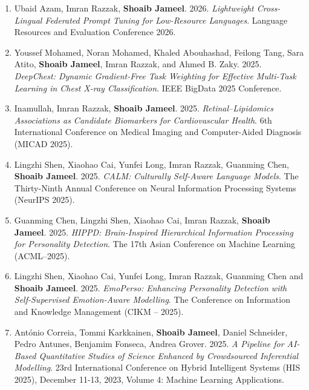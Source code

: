 \documentclass[margin]{res}
\begin{document}
\begin{resume}
\begin{enumerate}
\item Ubaid Azam, Imran Razzak, \textbf{Shoaib Jameel}. 2026. \textit{Lightweight Cross-Lingual Federated Prompt Tuning for Low-Resource Languages}. Language Resources and Evaluation Conference 2026. \\

\item Youssef Mohamed, Noran Mohamed, Khaled Abouhashad, Feilong Tang, Sara Atito, \textbf{Shoaib Jameel}, Imran Razzak, and Ahmed B. Zaky. 2025. \textit{DeepChest: Dynamic Gradient-Free Task Weighting for Effective Multi-Task Learning in Chest X-ray Classification}. IEEE BigData 2025 Conference. \\

\item Inamullah, Imran Razzak, \textbf{Shoaib Jameel}. 2025. \textit{Retinal–Lipidomics Associations as Candidate Biomarkers for Cardiovascular Health}. 6th International Conference on Medical Imaging and Computer-Aided Diagnosis (MICAD 2025). \\

\item Lingzhi Shen, Xiaohao Cai, Yunfei Long, Imran Razzak, Guanming Chen, \textbf{Shoaib Jameel}. 2025. \textit{CALM: Culturally Self-Aware Language Models}. The Thirty-Ninth Annual Conference on Neural Information Processing Systems (NeurIPS 2025). \\

\item Guanming Chen, Lingzhi Shen, Xiaohao Cai, Imran Razzak, \textbf{Shoaib Jameel}. 2025. \textit{HIPPD: Brain-Inspired Hierarchical Information Processing for Personality Detection}. The 17th Asian Conference on Machine Learning (ACML--2025). \\

\item  Lingzhi Shen, Xiaohao Cai, Yunfei Long, Imran Razzak, Guanming Chen and \textbf{Shoaib Jameel}. 2025. \textit{EmoPerso: Enhancing Personality Detection with Self-Supervised Emotion-Aware Modelling}. The Conference on Information and Knowledge Management (CIKM -- 2025). \\

\item Ant\'onio Correia, Tommi Karkkainen, \textbf{Shoaib Jameel}, Daniel Schneider, Pedro Antunes, Benjamim Fonseca, Andrea Grover. 2025. \textit{A Pipeline for AI-Based Quantitative Studies of Science Enhanced by Crowdsourced Inferential Modelling}. 23rd International Conference on Hybrid Intelligent Systems (HIS 2025), December 11-13, 2023, Volume 4: Machine Learning Applications. \\


\end{enumerate}
\end{resume}
\end{document}
